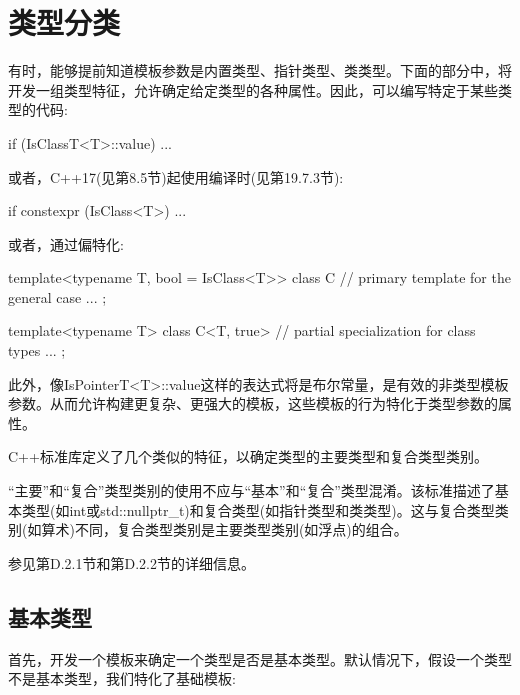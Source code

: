 \section{类型分类}

有时，能够提前知道模板参数是内置类型、指针类型、类类型。下面的部分中，将开发一组类型特征，允许确定给定类型的各种属性。因此，可以编写特定于某些类型的代码:

\begin{cpp}
if (IsClassT<T>::value) {
	...
}
\end{cpp}

或者，C++17(见第8.5节)起使用编译时(见第19.7.3节):

\begin{cpp}
if constexpr (IsClass<T>) {
	...
}
\end{cpp}

或者，通过偏特化:

\begin{cpp}
template<typename T, bool = IsClass<T>>
class C { // primary template for the general case
	...
};

template<typename T>
class C<T, true> { // partial specialization for class types
	...
};
\end{cpp}

此外，像IsPointerT<T>::value这样的表达式将是布尔常量，是有效的非类型模板参数。从而允许构建更复杂、更强大的模板，这些模板的行为特化于类型参数的属性。

C++标准库定义了几个类似的特征，以确定类型的主要类型和复合类型类别。

\begin{notice}
“主要”和“复合”类型类别的使用不应与“基本”和“复合”类型混淆。该标准描述了基本类型(如int或std::nullptr\_t)和复合类型(如指针类型和类类型)。这与复合类型类别(如算术)不同，复合类型类别是主要类型类别(如浮点)的组合。
\end{notice}

参见第D.2.1节和第D.2.2节的详细信息。

\subsection{基本类型}

首先，开发一个模板来确定一个类型是否是基本类型。默认情况下，假设一个类型不是基本类型，我们特化了基础模板:

